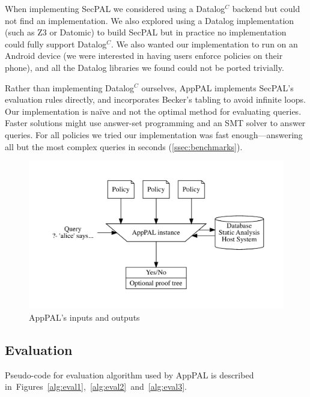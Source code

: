 \documentclass[thesis.tex]{subfiles}
\begin{document}
When implementing SecPAL we considered using a Datalog$^C$ backend but could not
find an implementation. We also explored using a Datalog implementation (such as
Z3 or Datomic) to build SecPAL but in practice no implementation could fully
support Datalog$^C$. We also wanted our implementation to run on an Android
device (we were interested in having users enforce policies on their phone),
and all the Datalog libraries we found could not be ported trivially.

Rather than implementing Datalog$^C$ ourselves, AppPAL implements SecPAL's
evaluation rules directly, and incorporates Becker's tabling to avoid infinite
loops. Our implementation is na\"ive and not the optimal method for evaluating
queries. Faster solutions might use answer-set programming and an SMT solver to
answer queries. For all policies we tried our implementation was fast
enough---answering all but the most complex queries in seconds
(\autoref{ssec:benchmarks}).


\begin{figure}
  \centering
  \includegraphics[width=\linewidth]{figures/apppal-evaluation.pdf}
  \caption{AppPAL's inputs and outputs}
  \label{fig:apppal-inputs-outputs}
\end{figure}

\subsection{Evaluation}
\label{ssec:evaluation-alg}

Pseudo-code for evaluation algorithm used by AppPAL is described
in~Figures~\ref{alg:eval1},~\ref{alg:eval2}~and~\ref{alg:eval3}.
\end{document}
